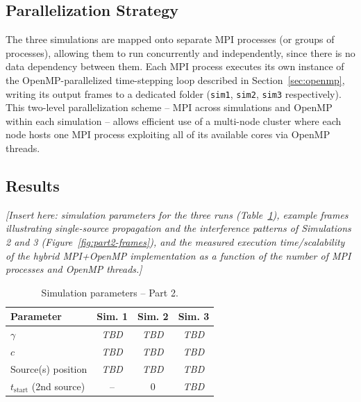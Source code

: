\documentclass[10pt,twocolumn]{article}
\begin{document}
\subsection{Parallelization Strategy}
The three simulations are mapped onto separate MPI processes (or groups of processes),
allowing them to run concurrently and independently, since there is no data dependency between
them. Each MPI process executes its own instance of the OpenMP-parallelized time-stepping loop
described in Section~\ref{sec:openmp}, writing its output frames to a dedicated folder
(\texttt{sim1}, \texttt{sim2}, \texttt{sim3} respectively). This two-level parallelization
scheme -- MPI across simulations and OpenMP within each simulation -- allows efficient use of
a multi-node cluster where each node hosts one MPI process exploiting all of its available
cores via OpenMP threads.


\subsection{Results}
\textit{[Insert here: simulation parameters for the three runs (Table~\ref{tab:part2-params}),
example frames illustrating single-source propagation and the interference patterns of
Simulations 2 and 3 (Figure~\ref{fig:part2-frames}), and the measured execution time/scalability
of the hybrid MPI+OpenMP implementation as a function of the number of MPI processes and OpenMP
threads.]}

\begin{table}[h]
\centering
\caption{Simulation parameters -- Part 2.}
\label{tab:part2-params}
\begin{tabular}{lccc}
\toprule
Parameter & Sim. 1 & Sim. 2 & Sim. 3 \\
\midrule
$\gamma$               & \textit{TBD} & \textit{TBD} & \textit{TBD} \\
$c$                    & \textit{TBD} & \textit{TBD} & \textit{TBD} \\
Source(s) position     & \textit{TBD} & \textit{TBD} & \textit{TBD} \\
$t_{\text{start}}$ (2nd source) & -- & 0 & \textit{TBD} \\
\bottomrule
\end{tabular}
\end{table}
\end{document}
